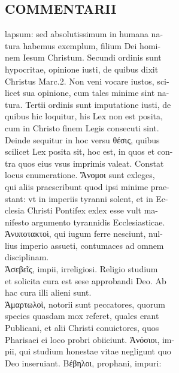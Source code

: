 \documentclass{article}
\begin{document}
\begin{pages}
\section*{COMMENTARII \\
                }lapsum: sed absolutissimum in humana na- \\
                tura habemus exemplum, filium Dei homi- \\
                nem Iesum Christum. Secundi ordinis sunt \\
                hypocritae, opinione iusti, de quibus dixit \\
                Christus Marc.2. Non veni vocare iustos, sci- \\
                licet sua opinione, cum tales minime sint na- \\
                tura. Tertii ordinis sunt imputatione iusti, de \\
                quibus hic loquitur, his Lex non est posita, \\
                cum in Christo finem Legis consecuti sint. \\
                Deinde sequitur in hoc versu θέσις, quibus \\
                scilicet Lex posita sit, hoc est, in quos et con- \\
                tra quos eius vsus imprimis valeat. Constat \\
                locus enumeratione. Ἄνομοι sunt exleges, \\
                qui aliis praescribunt quod ipsi minime prae- \\
                stant: vt in imperiis tyranni solent, et in Ec- \\
                clesia Christi Pontifex exlex esse vult ma- \\
                nifesto argumento tyrannidis Ecclesiasticae. \\
                Ἀνυποτακτοὶ, qui iugum ferre nesciunt, nul- \\
                lius imperio assueti, contumaces ad omnem \\
                disciplinam. \\
                Ἀσεβεῖς, impii, irreligiosi. Religio studium \\
                et solicita cura est sese approbandi Deo. Ab \\
                hac cura illi alieni sunt. \\
                Ἁμαρτωλοὶ, notorii sunt peccatores, quorum \\
                species quasdam mox referet, quales erant \\
                Publicani, et alii Christi conuictores, quos \\
                Pharisaei ei loco probri obiiciunt. Ἀνόσιοι, im- \\
                pii, qui studium honestae vitae negligunt quo \\
                Deo inseruiant. Βέβηλοι, prophani, impuri: \\
                

\end{pages}
\end{document}
